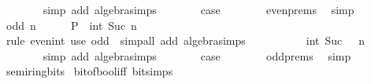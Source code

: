 \begin{isabellebody}
\ \ \ \ \ \ \isamarkupfalse%
\ {\isacharparenleft}{\kern0pt}simp\ add{\isacharcolon}{\kern0pt}\ algebra{\isacharunderscore}{\kern0pt}simps{\isacharparenright}{\kern0pt}\isanewline
\ \ \ \ \isamarkupfalse%
\ \isamarkupfalse%
\ {\isacharquery}{\kern0pt}case\isanewline
\ \ \ \ \ \ \isamarkupfalse%
\ even{\isachardot}{\kern0pt}prems\ \isamarkupfalse%
\ simp\isanewline
\ \ \isamarkupfalse%
\isanewline
\ \ \ \ \isamarkupfalse%
\ {\isacharparenleft}{\kern0pt}odd\ n{\isacharparenright}{\kern0pt}\isanewline
\ \ \ \ \isamarkupfalse%
\ {\isachardoublequoteopen}P\ {\isacharparenleft}{\kern0pt}{\isacharminus}{\kern0pt}\ int\ {\isacharparenleft}{\kern0pt}Suc\ n{\isacharparenright}{\kern0pt}\ {\isacharasterisk}{\kern0pt}\ {}{\isacharparenright}{\kern0pt}{\isachardoublequoteclose}\isanewline
\ \ \ \ \ \ \isamarkupfalse%
\ {\isacharparenleft}{\kern0pt}rule\ even{\isacharunderscore}{\kern0pt}int{\isacharparenright}{\kern0pt}\ {\isacharparenleft}{\kern0pt}use\ odd\ \ {\isacartoucheopen}simp{\isacharunderscore}{\kern0pt}all\ add{\isacharcolon}{\kern0pt}\ algebra{\isacharunderscore}{\kern0pt}simps{\isacartoucheclose}{\isacharparenright}{\kern0pt}\isanewline
\ \ \ \ \isamarkupfalse%
\ \isamarkupfalse%
\ {\isachardoublequoteopen}{\isasymdots}\ {\isacharequal}{\kern0pt}\ {\isacharminus}{\kern0pt}\ int\ {\isacharparenleft}{\kern0pt}Suc\ {\isacharparenleft}{\kern0pt}{}\ {\isacharasterisk}{\kern0pt}\ n{\isacharparenright}{\kern0pt}{\isacharparenright}{\kern0pt}\ {\isacharminus}{\kern0pt}\ {}{\isachardoublequoteclose}\isanewline
\ \ \ \ \ \ \isamarkupfalse%
\ {\isacharparenleft}{\kern0pt}simp\ add{\isacharcolon}{\kern0pt}\ algebra{\isacharunderscore}{\kern0pt}simps{\isacharparenright}{\kern0pt}\isanewline
\ \ \ \ \isamarkupfalse%
\ \isamarkupfalse%
\ {\isacharquery}{\kern0pt}case\isanewline
\ \ \ \ \ \ \isamarkupfalse%
\ odd{\isachardot}{\kern0pt}prems\ \isamarkupfalse%
\ simp\isanewline
\ \ \isamarkupfalse%
\isanewline
{}\isamarkupfalse%
%
\endisatagproof
{\isafoldproof}%
%
\isadelimproof
\isanewline
%
\endisadelimproof
\isanewline
{}\isamarkupfalse%
\ semiring{\isacharunderscore}{\kern0pt}bits\isanewline
{}\isanewline
\isanewline
{}\isamarkupfalse%
\ bit{\isacharunderscore}{\kern0pt}of{\isacharunderscore}{\kern0pt}bool{\isacharunderscore}{\kern0pt}iff\ {\isacharbrackleft}{\kern0pt}bit{\isacharunderscore}{\kern0pt}simps{\isacharbrackright}{\kern0pt}{\isacharcolon}{\kern0pt}\isanewline

\end{isabellebody}
